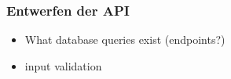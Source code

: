 \subsubsection{Entwerfen der API}
\label{ssub:entwerfen_der_api}
  \begin{itemize}
    \item What database queries exist (endpoints?)
    \item input validation
  \end{itemize}
